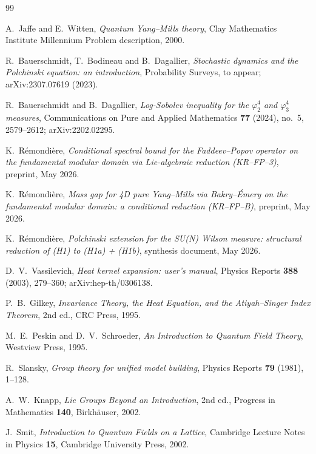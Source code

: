 \documentclass[11pt,a4paper]{amsart}
\theoremstyle{definition}
\begin{document}
\begin{thebibliography}{99}

A.~Jaffe and E.~Witten,
\emph{Quantum Yang--Mills theory},
Clay Mathematics Institute Millennium Problem description, 2000.

R.~Bauerschmidt, T.~Bodineau and B.~Dagallier,
\emph{Stochastic dynamics and the Polchinski equation: an introduction},
Probability Surveys, to appear; arXiv:2307.07619 (2023).

R.~Bauerschmidt and B.~Dagallier,
\emph{Log-Sobolev inequality for the $\varphi^4_2$ and $\varphi^4_3$ measures},
Communications on Pure and Applied Mathematics \textbf{77} (2024), no.~5, 2579--2612;
arXiv:2202.02295.

K.~R\'emondi\`ere,
\emph{Conditional spectral bound for the Faddeev--Popov operator on the
fundamental modular domain via Lie-algebraic reduction (KR--FP--3)},
preprint, May 2026.

K.~R\'emondi\`ere,
\emph{Mass gap for 4D pure Yang--Mills via Bakry--\'Emery on the fundamental
modular domain: a conditional reduction (KR--FP--B)},
preprint, May 2026.

K.~R\'emondi\`ere,
\emph{Polchinski extension for the SU(N) Wilson measure: structural reduction
of (H1) to (H1a) + (H1b)},
synthesis document, May 2026.

D.~V.~Vassilevich,
\emph{Heat kernel expansion: user's manual},
Physics Reports \textbf{388} (2003), 279--360; arXiv:hep-th/0306138.

P.~B.~Gilkey,
\emph{Invariance Theory, the Heat Equation, and the Atiyah--Singer Index Theorem},
2nd ed., CRC Press, 1995.

M.~E.~Peskin and D.~V.~Schroeder,
\emph{An Introduction to Quantum Field Theory},
Westview Press, 1995.

R.~Slansky,
\emph{Group theory for unified model building},
Physics Reports \textbf{79} (1981), 1--128.

A.~W.~Knapp,
\emph{Lie Groups Beyond an Introduction},
2nd ed., Progress in Mathematics \textbf{140}, Birkh\"auser, 2002.

J.~Smit,
\emph{Introduction to Quantum Fields on a Lattice},
Cambridge Lecture Notes in Physics \textbf{15}, Cambridge University Press, 2002.


\end{thebibliography}
\end{document}
